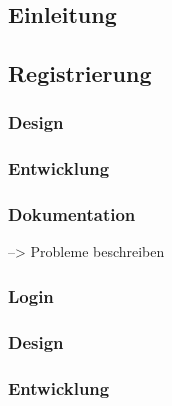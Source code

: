 \documentclass[12pt,a4paper]{article}
\begin{document}
\subsection*{Einleitung}
\newpage

\subsection{Registrierung}
\subsubsection*{Design}
\subsubsection*{Entwicklung}
\subsubsection*{Dokumentation} --> Probleme beschreiben

\newpage
\subsubsection{Login}
\subsubsection*{Design}
\subsubsection*{Entwicklung}
\end{document}
